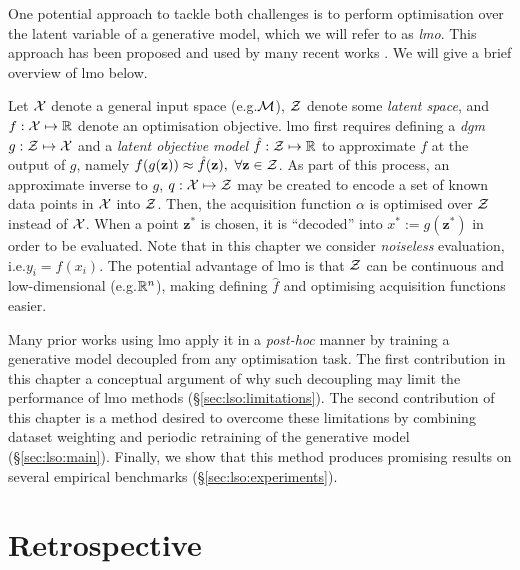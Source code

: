 One potential approach to tackle both challenges
is to perform optimisation over the latent variable of a generative model,
which we will refer to as \emph{\gls{lmo}}.
This approach has been proposed and used by many recent works
\citep{gomez2018,kusner_grammar_2017,lu2018structured,eismann_bayesian_2018,luo2018neural,kajino_molecular_2019,nguyen_synthesizing_2016,dai_syntax-directed_2018,daxberger2019bayesian,griffiths_constrained_2020,mahmood_cold_2019,antoran_getting_2020}.
We will give a brief overview of \gls{lmo} below.

Let $\mathcal{X}$ denote a general input space (e.g.\@ $\mathcal{M}$),
$\mathcal{Z}$ denote some \emph{latent space},
and $f:\mathcal{X}\mapsto\mathbb{R}$ denote an optimisation objective.
\Gls{lmo} first requires defining a \emph{\gls{dgm}}
$g: \mathcal{Z}\mapsto\mathcal{X}$ 
and a \emph{latent objective model} $\hat f: \mathcal{Z}\mapsto\mathbb{R}$
to approximate $f$ at the output of $g$, namely $f(g(\mathbf{z}))\approx \hat f(\mathbf{z}),\ \forall \mathbf{z}\in\mathcal{Z}$.
As part of this process,
an approximate inverse to $g$, $q:\mathcal{X}\mapsto\mathcal{Z}$
may be created to encode a set of known data points in $\mathcal{X}$ into $\mathcal{Z}$.
Then, the acquisition function $\alpha$
is optimised over $\mathcal{Z}$ instead of $\mathcal{X}$.
When a point $\bm{z}^*$ is chosen,
it is ``decoded'' into $x^*:=g(\bm{z}^*)$ in order to be evaluated.
Note that in this chapter we consider \emph{noiseless} evaluation,
i.e.\@ $y_i=f(x_i)$.
The potential advantage of \gls{lmo} is that $\mathcal{Z}$ can be continuous and low-dimensional (e.g.\@ $\mathbb{R}^n$),
making defining $\hat f$ and optimising acquisition functions easier.

Many prior works using \gls{lmo} apply it in a \textit{post-hoc} manner
by training a generative model decoupled from any optimisation task.
The first contribution in this chapter
a conceptual argument of why such decoupling may limit the performance of \gls{lmo} methods
(\S\ref{sec:lso:limitations}).
The second contribution of this chapter is a method desired to overcome these limitations
by combining dataset weighting and periodic retraining of the generative model (\S\ref{sec:lso:main}).
Finally, we show that this
method produces promising results on several empirical benchmarks (\S\ref{sec:lso:experiments}).








\section{Retrospective}

